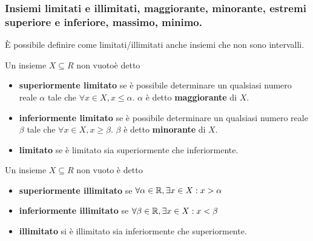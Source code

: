 \documentclass{book}     %
\begin{document}
\subsubsection{Insiemi limitati e illimitati, maggiorante, minorante, estremi superiore e inferiore, massimo, minimo.}
È possibile definire come limitati/illimitati anche insiemi che non sono intervalli. 
\begin{boxdef}
    Un insieme $X\subseteq R$ non vuotoè detto
    \begin{itemize}
        \item \textbf{superiormente limitato} se è possibile determinare un qualsiasi numero reale $\alpha$ tale che $\forall x \in X, x\leq \alpha$. $\alpha$ è detto \textbf{maggiorante} di $X$.
        \item \textbf{inferiormente limitato} se è possibile determinare un qualsiasi numero reale $\beta$ tale che $\forall x \in X, x\geq \beta$. $\beta$ è detto \textbf{minorante} di $X$.
        \item \textbf{limitato} se è limitato sia superiormente che inferiormente.
    \end{itemize}
\end{boxdef}
\begin{boxdef}
    Un insieme $X\subseteq R$ non vuoto è detto 
    \begin{itemize}
        \item \textbf{superiormente illimitato} se $\forall \alpha \in \mathbb{R}, \exists x \in X : x>\alpha$
        \item \textbf{inferiormente illimitato} se $\forall \beta \in \mathbb{R}, \exists x \in X : x<\beta$
        \item \textbf{illimitato} si è illimitato sia inferiormente che superiormente.
    \end{itemize}
\end{boxdef}
\end{document}
